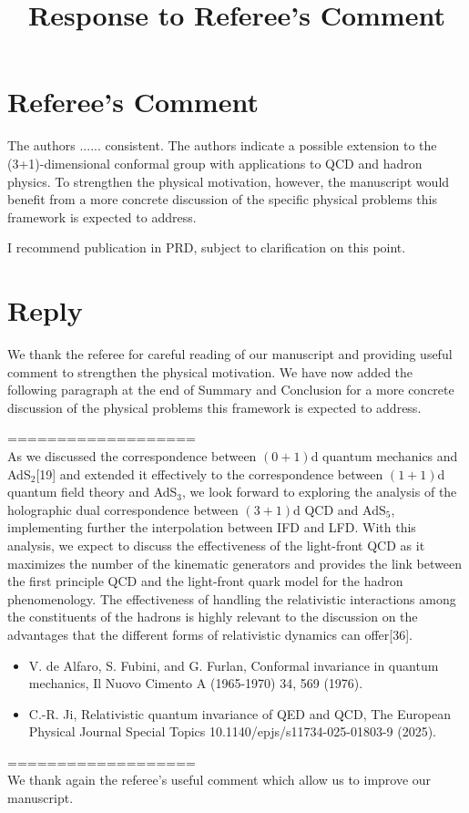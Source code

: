 \documentclass[]{article}
\title{Response to Referee's Comment}
\date{}
\numberwithin{equation}{section}
\begin{document}
	\maketitle

\section*{Referee's Comment}

The authors ......   consistent. 
 The authors indicate a possible extension to the (3+1)-dimensional conformal group with applications to QCD and hadron physics. To strengthen the physical motivation, however, the manuscript would benefit from a more concrete discussion of the specific physical problems this framework is expected to address. 

\noindent
I recommend publication in PRD, subject to clarification on this point. 

\section*{Reply}

We thank the referee for careful reading of our manuscript and providing useful comment to strengthen the physical motivation. We have now added the following paragraph at the end of Summary and Conclusion for a more concrete discussion of the physical problems this framework is expected to address.

\vskip 0.5cm
\noindent
===================\\
As we discussed the correspondence 
 between $(0+1)$d quantum mechanics and AdS$_2$[19] and extended it effectively to the correspondence between $(1+1)$d quantum field theory and AdS$_3$, we look forward to exploring the analysis of the holographic dual correspondence between $(3+1)$d QCD and AdS$_5$, implementing further the interpolation between IFD and LFD. With this analysis, we expect to discuss the effectiveness of the light-front QCD as it maximizes the number of the kinematic generators and provides the link between the first principle QCD and the light-front quark model for the hadron phenomenology. The effectiveness of handling the relativistic interactions among the constituents of the hadrons is highly relevant to the discussion on the advantages that the different forms of relativistic dynamics can offer[36]. 
\vskip 0.5cm

\begin{itemize}
  \item[] [19] V. de Alfaro, S. Fubini, and G. Furlan, Conformal invariance in quantum mechanics, Il Nuovo Cimento A (1965-1970) 34, 569 (1976).
  \item[] [36] C.-R. Ji, Relativistic quantum invariance of QED and QCD, The European Physical Journal Special Topics 10.1140/epjs/s11734-025-01803-9 (2025).
\end{itemize}
===================\\

\noindent
We thank again the referee's useful comment which allow us to improve our manuscript. 
\end{document}
